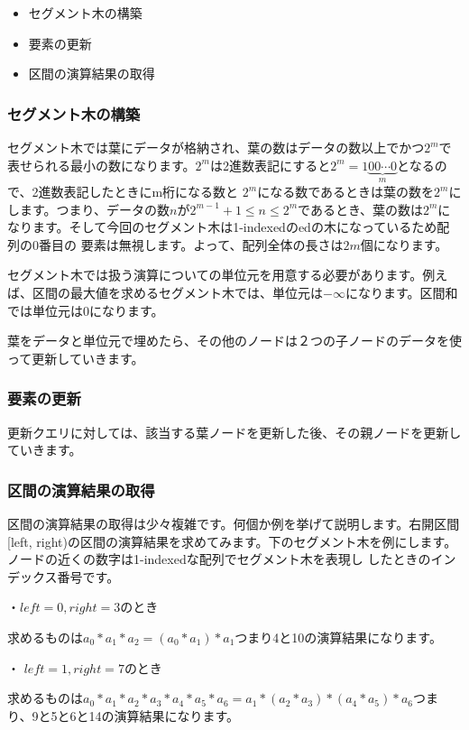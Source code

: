 \begin{itemize}
	\item セグメント木の構築
	\item 要素の更新
	\item 区間の演算結果の取得
\end{itemize}

\subsubsection{セグメント木の構築}
セグメント木では葉にデータが格納され、葉の数はデータの数以上でかつ$2^m$で表せられる最小の数になります。$2^m$は2進数表記にすると$2^m = 1\underbrace{00\cdots0}_{m}$となるので、2進数表記したときにm桁になる数と
$2^m$になる数であるときは葉の数を$2^m$にします。つまり、データの数$n$が$2^{m-1} + 1 \leq n \leq 2^m$であるとき、葉の数は$2^m$になります。そして今回のセグメント木は1-indexedのedの木になっているため配列の0番目の
要素は無視します。よって、配列全体の長さは$2 m$個になります。

セグメント木では扱う演算についての単位元を用意する必要があります。例えば、区間の最大値を求めるセグメント木では、単位元は$-\infty$になります。区間和では単位元は0になります。

葉をデータと単位元で埋めたら、その他のノードは２つの子ノードのデータを使って更新していきます。

\subsubsection{要素の更新}
更新クエリに対しては、該当する葉ノードを更新した後、その親ノードを更新していきます。

\subsubsection{区間の演算結果の取得}
区間の演算結果の取得は少々複雑です。何個か例を挙げて説明します。右開区間[left, right)の区間の演算結果を求めてみます。下のセグメント木を例にします。ノードの近くの数字は1-indexedな配列でセグメント木を表現し
したときのインデックス番号です。

・$left = 0, right = 3$のとき

求めるものは$a_0 * a_1 * a_2 = (a_0 * a_1) * a_1$つまり4と10の演算結果になります。 

・ $left = 1, right = 7$のとき

求めるものは$a_0 * a_1 * a_2 * a_3 * a_4 * a_5 * a_6 = a_1 * (a_2 * a_3) * (a_4 * a_5) * a_6$つまり、9と5と6と14の演算結果になります。

